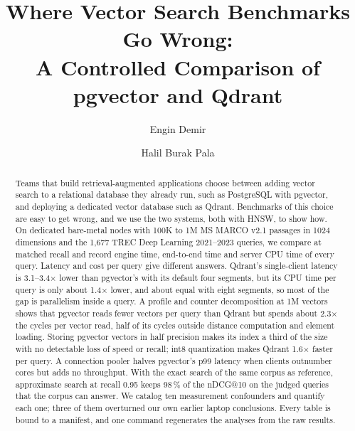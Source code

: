 \documentclass[preprint,12pt]{elsarticle}
\begin{document}
\begin{frontmatter}

\title{Where Vector Search Benchmarks Go Wrong:\\
A Controlled Comparison of pgvector and Qdrant}

\author[hu]{Engin Demir}

\author[hu]{Halil Burak Pala}


\begin{abstract}
Teams that build retrieval-augmented applications choose between adding vector search to a relational
database they already run, such as PostgreSQL with pgvector, and deploying a dedicated vector database
such as Qdrant. Benchmarks of this choice are easy to get wrong, and we use the two systems, both with
HNSW, to show how. On dedicated bare-metal nodes with 100K to 1M MS MARCO v2.1 passages in 1024 dimensions
and the 1{,}677 TREC Deep Learning 2021--2023 queries, we compare at matched recall and record engine time,
end-to-end time and server CPU time of every query. Latency and cost per query give different answers.
Qdrant's single-client latency is 3.1--3.4$\times$ lower than pgvector's with its default four segments, but
its CPU time per query is only about 1.4$\times$ lower, and about equal with eight segments, so most of the gap
is parallelism inside a query. A profile and counter decomposition at 1M vectors shows that pgvector reads
fewer vectors per query than Qdrant but spends about 2.3$\times$ the cycles per vector read, half of its cycles
outside distance computation and element loading. Storing pgvector vectors in half precision makes its index a
third of the size with no detectable loss of speed or recall; int8 quantization makes Qdrant 1.6$\times$ faster
per query. A connection pooler halves pgvector's p99 latency when clients outnumber cores but adds no throughput. With the
exact search of the same corpus as reference, approximate search at recall 0.95 keeps 98\,\% of the nDCG@10 on the judged
queries that the corpus can answer. We catalog ten measurement confounders and quantify each one; three of them overturned our own
earlier laptop conclusions. Every table is bound to a manifest, and one command regenerates the analyses from the raw results.
\end{abstract}


\end{frontmatter}
\end{document}
